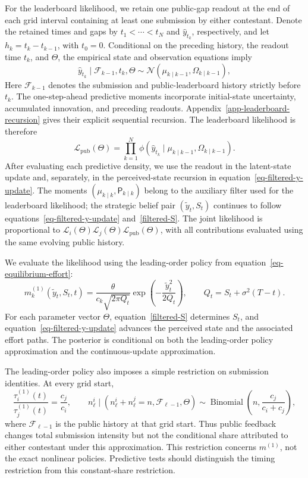 \documentclass[mnsc]{informs3}
\begin{document}
For the leaderboard likelihood, we retain one public-gap readout at the end of each grid interval containing at least one submission by either contestant. Denote the retained times and gaps by $t_1<\cdots<t_N$ and $\hat y_{t_k}$, respectively, and let $h_k=t_k-t_{k-1}$, with $t_0=0$. Conditional on the preceding history, the readout time $t_k$, and $\Theta$, the empirical state and observation equations imply
\[
{\hat y_{t_k}\mid\mathcal F_{k-1},t_k,\Theta}
\sim
\mathcal N\!\left(\mu_{k\mid k-1},\Omega_{k\mid k-1}\right),
\]
{Here $\mathcal F_{k-1}$ denotes the submission and public-leaderboard history strictly before $t_k$. The one-step-ahead predictive moments incorporate initial-state uncertainty, accumulated innovation, and preceding readouts. Appendix~\ref{app-leaderboard-recursion} gives their explicit sequential recursion. The leaderboard likelihood is therefore}
\begin{equation}\label{eq-obs_gap-prob}
{\mathcal L_{\mathrm{pub}}(\Theta)}
=
\prod_{k=1}^N
\phi\left(\hat y_{t_k}\mid\mu_{k\mid k-1},\Omega_{k\mid k-1}\right).
\end{equation}
{After evaluating each predictive density, we use the readout in the latent-state update and, separately, in the perceived-state recursion in equation~\eqref{eq-filtered-y-update}. The moments $(\mu_{k\mid k},\mathsf P_{k\mid k})$ belong to the auxiliary filter used for the leaderboard likelihood; the strategic belief pair $(\tilde y_t,S_t)$ continues to follow equations~\eqref{eq-filtered-y-update} and~\eqref{filtered-S}. The joint likelihood is proportional to $\mathcal L_i(\Theta)\mathcal L_j(\Theta)\mathcal L_{\mathrm{pub}}(\Theta)$, with all contributions evaluated using the same evolving public history.}

{We evaluate the likelihood using the leading-order policy from equation~\eqref{eq-equilibrium-effort}:}
\begin{equation}\label{eq-empirical-leading-effort}
{m_k^{(1)}(\tilde y_t,S_t,t)
=\frac{\theta}{c_k\sqrt{2\pi Q_t}}
\exp\!\left(-\frac{\tilde y_t^2}{2Q_t}\right),
\qquad Q_t=S_t+\sigma^2(T-t).}
\end{equation}
{For each parameter vector $\Theta$, equation~\eqref{filtered-S} determines $S_t$, and equation~\eqref{eq-filtered-y-update} advances the perceived state and the associated effort paths. The posterior is conditional on both the leading-order policy approximation and the continuous-update approximation.}

\begingroup
The leading-order policy also imposes a simple restriction on submission identities. At every grid start,
\[
\frac{\tau_i^{(1)}(t)}{\tau_j^{(1)}(t)}=\frac{c_j}{c_i},
\qquad
n_\ell^i\mid(n_\ell^i+n_\ell^j=n,\mathcal F_{\ell-1},\Theta)
\sim\operatorname{Binomial}\!\left(n,\frac{c_j}{c_i+c_j}\right),
\]
where $\mathcal F_{\ell-1}$ is the public history at that grid start.
Thus public feedback changes total submission intensity but not the conditional share attributed to either contestant under this approximation. This restriction concerns $m^{(1)}$, not the exact nonlinear policies. Predictive tests should distinguish the timing restriction from this constant-share restriction.
\par\endgroup
\end{document}
